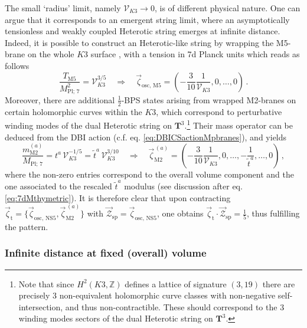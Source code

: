 The small `radius' limit, namely $\mathcal{V}_{K3} \to 0$, is of different physical nature. One can argue that it corresponds to an emergent string limit, where an asymptotically tensionless and weakly coupled Heterotic string emerges at infinite distance. Indeed, it is possible to construct an Heterotic-like string by wrapping the M5-brane on the whole $K3$ surface \cite{Cherkis:1997bx,Park_2009}, with a tension in 7d Planck units which reads as follows
%
\begin{equation}
	\frac{T_{\text{M5}}}{M_{\text{Pl};\, 7}^2} = \mathcal{V}_{K3}^{3/5} \quad \Longrightarrow \quad \vec{\zeta}_{\text{osc, M5}} = \left( -\frac{3}{10} \frac{1}{\mathcal{V}_{K3}}, 0, \ldots, 0 \right)\, .
\end{equation}
%
Moreover, there are additional $\frac{1}{2}$-BPS states arising from wrapped M2-branes on certain holomorphic curves within the $K3$, which correspond to perturbative winding modes of the dual Heterotic string on $\mathbf{T}^3$.\footnote{Note that since $H^2(K3, \mathbb{Z})$ defines a lattice of signature $(3,19)$ there are precisely 3 non-equivalent holomorphic curve classes with non-negative self-intersection, and thus non-contractible. These should correspond to the 3 winding modes sectors of the dual Heterotic string on $\mathbf{T}^3$.} Their mass operator can be deduced from the DBI action (c.f. eq. \eqref{eq:DBICSactionMpbranes}), and yields 
%
\begin{equation}\label{eq:M2mass&vectors}
	\frac{m_{\text{M2}}^{(a)}}{M_{\text{Pl};\, 7}} = t^a\, \mathcal{V}_{K3}^{-1/5} = \tilde{t}^a\, \mathcal{V}_{K3}^{3/10} \quad \Longrightarrow \quad \vec{\zeta}^{\,(a)}_{\text{M2}} = \left( -\frac{3}{10} \frac{1}{\mathcal{V}_{K3}}, 0, \ldots, -\frac{1}{\tilde{t}^a}, \ldots, 0 \right)\, ,
\end{equation}
%
where the non-zero entries correspond to the overall volume component and the one associated to the rescaled $\tilde{t}^a$ modulus (see discussion after eq. \eqref{eq:7dMthymetric}). It is therefore clear that upon contracting $\vec{\zeta}_{\text{t}}= \lbrace \vec{\zeta}_{\text{osc, NS5}}, \vec{\zeta}^{\,(a)}_{\text{M2}} \rbrace$ with $\vec{\mathcal{Z}}_{\text{sp}}=\vec{\zeta}_{\text{osc, NS5}}$, one obtains $\vec{\zeta}_{\text{t}} \cdot \vec{\mathcal{Z}}_{\text{sp}}= \frac{1}{5}$, thus fulfilling the pattern.
	
\subsubsection*{Infinite distance at fixed (overall) volume}
	
